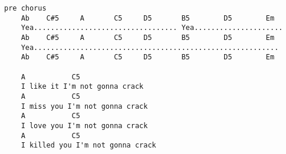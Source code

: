 \begin{verbatim}
pre chorus
    Ab    C#5     A       C5     D5       B5        D5        Em
    Yea.................................. Yea.....................
    Ab    C#5     A       C5     D5       B5        D5        Em
    Yea..........................................................
    Ab    C#5     A       C5     D5       B5        D5        Em

    A           C5     
    I like it I'm not gonna crack      
    A           C5     
    I miss you I'm not gonna crack
    A           C5     
    I love you I'm not gonna crack 
    A           C5     
    I killed you I'm not gonna crack
\end{verbatim}